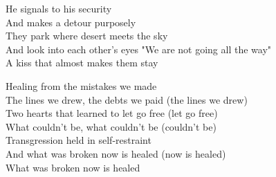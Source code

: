 \begin{lyrics}
He signals to his security\\
And makes a detour purposely\\
They park where desert meets the sky\\
And look into each other's eyes
"We are not going all the way"\\
A kiss that almost makes them stay

Healing from the mistakes we made\\
The lines we drew, the debts we paid (the lines we drew)\\
Two hearts that learned to let go free (let go free)\\
What couldn't be, what couldn't be (couldn't be)\\
Transgression held in self-restraint\\
And what was broken now is healed (now is healed)\\
What was broken now is healed
\end{lyrics}

